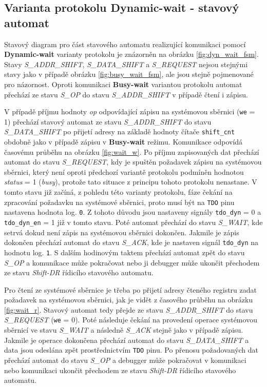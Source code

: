 \subsection{Varianta protokolu Dynamic-wait - stavový automat} \label{subsec:dyn-wait-fsm}
Stavový diagram pro část stavového automatu realizující komunikaci pomocí \textbf{Dynamic-wait} varianty protokolu je znázorněn na obrázku \ref{fig:dyn_wait_fsm}. Stavy \textit{S\_ADDR\_SHIFT}, \textit{S\_DATA\_SHIFT} a \textit{S\_REQUEST} nejsou stejnými stavy jako v případě obrázku \ref{fig:busy_wait_fsm}, ale jsou stejně pojmenované pro názornost. Oproti komunikaci \textbf{Busy-wait} variantou protokolu automat přechází ze stavu \textit{S\_OP} do stavu \textit{S\_ADDR\_SHIFT} v případě čtení i zápisu.

V případě příjmu hodnoty \textit{op} odpovídající zápisu na systémovou sběrnici (\texttt{we} = 1) přechází stavový automat ze stavu \textit{S\_ADDR\_SHIFT} do stavu \textit{S\_DATA\_SHIFT} po přijetí adresy na základě hodnoty čítače \texttt{shift\_cnt} obdobně jako v případě zápisu v \textbf{Busy-wait} režimu. Komunikace odpovídá časovému průběhu na obrázku \ref{fig:wait_w}. Po příjmu zapisovaných dat přechází automat do stavu \textit{S\_REQUEST}, kdy je spuštěn požadavek zápisu na systémovou sběrnici, který není oproti předchozí variantě protokolu podmíněn hodnotou \textit{status} = 1 (\textit{busy}), protože tato situace z principu tohoto protokolu nenastane. V tomto stavu již začíná, z pohledu této varianty protokolu, fáze čekání na zpracování požadavku na systémové sběrnici, proto musí být na \texttt{\acs{TDO}} pinu nastavena hodnota log. \texttt{0}. Z tohoto důvodu jsou nastaveny signály \texttt{tdo\_dyn} = 0 a \texttt{tdo\_dyn\_en} = 1 již v tomto stavu. Poté automat přechází do stavu \textit{S\_WAIT}, kde setrvá dokud není zápis na systémovou sběrnici dokončen. Jakmile je zápis dokončen přechází automat do stavu \textit{S\_ACK}, kde je nastaven signál \texttt{tdo\_dyn} na hodnotu log. \texttt{1}. S dalším hodinovým taktem přechází automat zpět do stavu \textit{S\_OP} a komunikace může pokračovat nebo ji debugger může ukončit přechodem ze stavu \textit{Shift-DR} řídicího stavového automatu.

Pro čtení ze systémové sběrnice je třeba po přijetí adresy čteného registru zadat požadavek na systémovou sběrnici, jak je vidět z časového průběhu na obrázku \ref{fig:wait_r}. Stavový automat tedy přejde ze stavu \textit{S\_ADDR\_SHIFT} do stavu \textit{S\_REQUEST} (\texttt{we} = 0). Poté následuje čekání na provedení operace systémovou sběrnicí ve stavu \textit{S\_WAIT} a následně \textit{S\_ACK} stejně jako v případě zápisu. Jakmile je operace dokončena přechází automat do stavu \textit{S\_DATA\_SHIFT} a data jsou odeslána zpět prostřednictvím \texttt{\acs{TDO}} pinu. Po přenosu požadovaných dat přechází automat do stavu \textit{S\_OP} a debugger může pokračovat v komunikaci nebo komunikaci ukončit přechodem ze stavu \textit{Shift-DR} řídicího stavového automatu.


